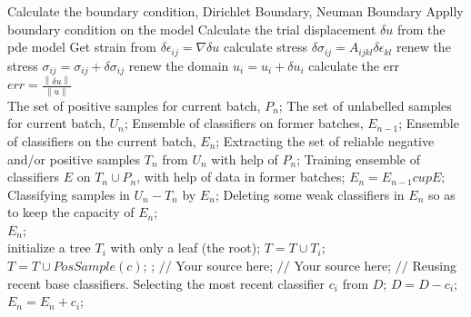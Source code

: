 \documentclass[12pt]{extarticle}
\begin{document}
\begin{algorithm}[htb]  
  \caption{ Framework of ensemble learning for our system.}  
 \label{alg:Framwork}  
 \begin{algorithmic}[1]  
 	\State Calculate the boundary condition, Dirichlet Boundary, Neuman Boundary
 	\State Applly boundary condition on the model
 	\State Calculate the trial displacement $\delta u $ from the pde model 
 	\State Get strain from $\delta \epsilon_{ij}=\nabla \delta u$
 	\State calculate stress $\delta \sigma_{ij} = A_{ijkl}\delta\epsilon_{kl}$
 	\State renew the stress $ \sigma_{ij} = \sigma_{ij}+\delta\sigma_{ij}$ 
 	\State renew the domain $ u_i=u_i+\delta u_i$ 
 	\State calculate the err $err=\frac{\left \| \delta u\right \|}{\left \| u \right \|} $
 	\EndWhile 
 	\\
    \Require  
      The set of positive samples for current batch, $P_n$;  
      The set of unlabelled samples for current batch, $U_n$;  
      Ensemble of classifiers on former batches, $E_{n-1}$;  
    \Ensure  
      Ensemble of classifiers on the current batch, $E_n$;  
    \State Extracting the set of reliable negative and/or positive samples $T_n$ from $U_n$ with help of $P_n$;  
    \label{code:fram:extract}  
    \State Training ensemble of classifiers $E$ on $T_n \cup P_n$, with help of data in former batches;  
    \label{code:fram:trainbase}  
    \State $E_n=E_{n-1}cup E$;  
    \label{code:fram:add}  
    \State Classifying samples in $U_n-T_n$ by $E_n$;  
    \label{code:fram:classify}  
    \State Deleting some weak classifiers in $E_n$ so as to keep the capacity of $E_n$;  
    \label{code:fram:select} \\  
    \Return $E_n$;  
    \\
      \State initialize a tree $T_{i}$ with only a leaf (the root);  
      \State $T=T\cup T_{i};$  
    \EndFor  
      \label{code:TrainBase:getc}  
      \State $T=T\cup PosSample(c)$;  
      \label{code:TrainBase:pos}  
    \EndFor;  
      \State $//$ Your source here;  
    \EndFor  
      \State $//$ Your source here;  
    \EndFor  
    \State $//$ Reusing recent base classifiers.  
    \label{code:recentStart}  
      \State Selecting the most recent classifier $c_i$ from $D$;  
      \State $D=D-c_i$;  
      \State $E_n=E_n+c_i$;  
    \EndWhile  
    \label{code:recentEnd}  
  \end{algorithmic} 
\end{algorithm}  
\end{document}
